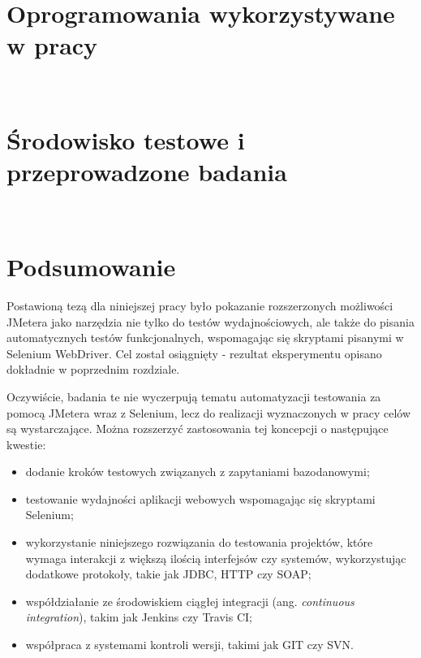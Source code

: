 \documentclass[12pt]{report}
\theoremstyle{definition}
\begin{document}



\bigskip \bigskip





\chapter{Oprogramowania wykorzystywane w pracy} \ \ \



\bigskip \bigskip




\chapter{Środowisko testowe i przeprowadzone badania} \ \ \




\bigskip \bigskip





\newpage
\chapter{Podsumowanie} 

Postawioną tezą dla niniejszej pracy było pokazanie rozszerzonych możliwości JMetera jako narzędzia nie tylko do testów wydajnościowych, ale także do pisania automatycznych testów funkcjonalnych, wspomagając się skryptami pisanymi w Selenium WebDriver. Cel został osiągnięty - rezultat eksperymentu opisano dokładnie w poprzednim rozdziale.

Oczywiście, badania te nie wyczerpują tematu automatyzacji testowania za pomocą JMetera wraz z Selenium, lecz do realizacji wyznaczonych w pracy celów są wystarczające. Można rozszerzyć zastosowania tej koncepcji o następujące kwestie:
\begin{itemize}
\item dodanie kroków testowych związanych z zapytaniami bazodanowymi;
\item testowanie wydajności aplikacji webowych wspomagając się skryptami Selenium;
\item wykorzystanie niniejszego rozwiązania do testowania projektów, które wymaga interakcji z większą ilością interfejsów czy systemów, wykorzystując dodatkowe protokoły, takie jak JDBC, HTTP czy SOAP;
\item współdziałanie ze środowiskiem ciągłej integracji (ang. \textit{continuous integration}), takim jak Jenkins czy Travis CI;
\item współpraca z systemami kontroli wersji, takimi jak GIT czy SVN.
\end{itemize}
\end{document}
